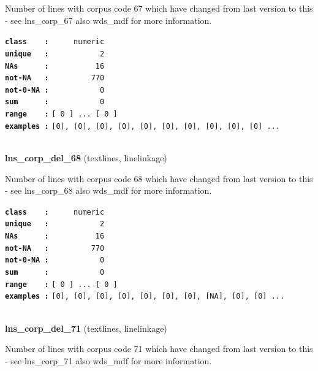 \documentclass[]{article}
\begin{document}
Number of lines with corpus code 67 which have changed from last version
to this - see lns\_corp\_67 also wds\_mdf for more information.

\textbf{\texttt{class\ \ \ \ :}} \texttt{~~~~~numeric}\\
\textbf{\texttt{unique\ \ \ :}} \texttt{~~~~~~~~~~~2}\\
\textbf{\texttt{NAs\ \ \ \ \ \ :}} \texttt{~~~~~~~~~~16}\\
\textbf{\texttt{not-NA\ \ \ :}} \texttt{~~~~~~~~~770}\\
\textbf{\texttt{not-0-NA\ :}} \texttt{~~~~~~~~~~~0}\\
\textbf{\texttt{sum\ \ \ \ \ \ :}} \texttt{~~~~~~~~~~~0}\\
\textbf{\texttt{range\ \ \ \ :}}
\texttt{{[}\ 0\ {]}\ ...\ {[}\ 0\ {]}}\\
\textbf{\texttt{examples\ :}}
\texttt{{[}0{]},\ {[}0{]},\ {[}0{]},\ {[}0{]},\ {[}0{]},\ {[}0{]},\ {[}0{]},\ {[}0{]},\ {[}0{]},\ {[}0{]}\ ...}\\

~

\textbf{lns\_corp\_del\_68} (textlines, linelinkage)

Number of lines with corpus code 68 which have changed from last version
to this - see lns\_corp\_68 also wds\_mdf for more information.

\textbf{\texttt{class\ \ \ \ :}} \texttt{~~~~~numeric}\\
\textbf{\texttt{unique\ \ \ :}} \texttt{~~~~~~~~~~~2}\\
\textbf{\texttt{NAs\ \ \ \ \ \ :}} \texttt{~~~~~~~~~~16}\\
\textbf{\texttt{not-NA\ \ \ :}} \texttt{~~~~~~~~~770}\\
\textbf{\texttt{not-0-NA\ :}} \texttt{~~~~~~~~~~~0}\\
\textbf{\texttt{sum\ \ \ \ \ \ :}} \texttt{~~~~~~~~~~~0}\\
\textbf{\texttt{range\ \ \ \ :}}
\texttt{{[}\ 0\ {]}\ ...\ {[}\ 0\ {]}}\\
\textbf{\texttt{examples\ :}}
\texttt{{[}0{]},\ {[}0{]},\ {[}0{]},\ {[}0{]},\ {[}0{]},\ {[}0{]},\ {[}0{]},\ {[}NA{]},\ {[}0{]},\ {[}0{]}\ ...}\\

~

\textbf{lns\_corp\_del\_71} (textlines, linelinkage)

Number of lines with corpus code 71 which have changed from last version
to this - see lns\_corp\_71 also wds\_mdf for more information.
\end{document}
